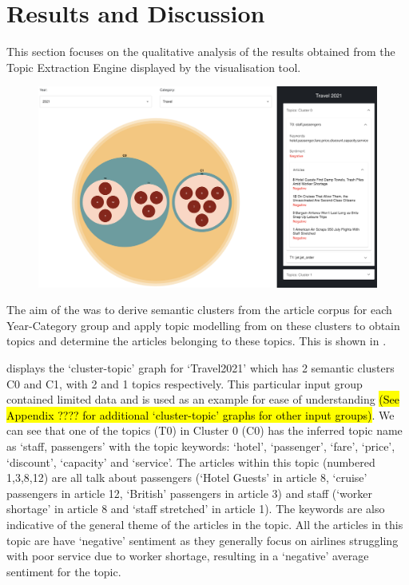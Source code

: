 \vspace{-1ex}
\section{Results and Discussion}

This section focuses on the qualitative analysis of the results obtained from the Topic Extraction Engine displayed by the visualisation tool. 
\vspace{-2ex}
\begin{figure}[H]
  \centering
  \includegraphics[width=0.85\linewidth]{images/travel2021_topics_cropped.png}
  \caption{}
  \label{fig:topics_travel2021}
\end{figure}
The aim of the was to derive semantic clusters from the article corpus for each Year-Category group and apply topic modelling from on these clusters to obtain topics and determine the articles belonging to these topics. This is shown in . 

 displays the `cluster-topic' graph for `Travel2021' which has 2 semantic clusters C0 and C1, with 2 and 1 topics respectively. This particular input group contained limited data and is used as an example for ease of understanding \hl{(See Appendix ???? for additional `cluster-topic' graphs for other input groups)}. We can see that one of the topics (T0) in Cluster 0 (C0) has the inferred topic name as `staff, passengers' with the topic keywords: `hotel', `passenger', `fare', `price', `discount', `capacity' and `service'. The articles within this topic (numbered 1,3,8,12) are all talk about passengers (`Hotel Guests' in article 8, `cruise' passengers in article 12, `British' passengers in article 3) and staff (`worker shortage' in article 8 and `staff stretched' in article 1). The keywords are also indicative of the general theme of the articles in the topic. All the articles in this topic are have `negative' sentiment as they generally focus on airlines struggling with poor service due to worker shortage, resulting in a `negative' average sentiment for the topic.

